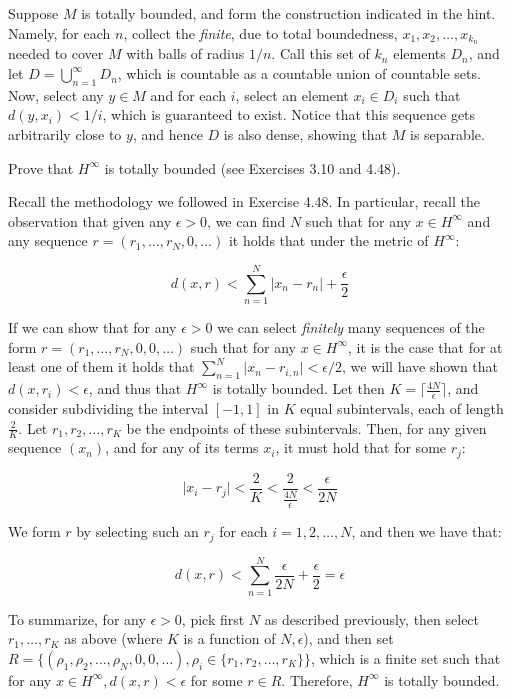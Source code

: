 \begin{solution}
    
    Suppose $M$ is totally bounded, and form the construction indicated in the hint.
    Namely, for each $n$, collect the \textit{finite}, due to total boundedness, $x_1, x_2, \ldots, x_{k_n}$ needed to cover $M$ with balls of radius $1/n$.
    Call this set of $k_n$ elements $D_n$, and let $D = \bigcup_{n=1}^{\infty} D_n$, which is countable as a countable union of countable sets.
    Now, select any $y \in M$ and for each $i$, select an element $x_i \in D_i$ such that $d(y, x_i) < 1/i$, which is guaranteed to exist.
    Notice that this sequence gets arbitrarily close to $y$, and hence $D$ is also dense, showing that $M$ is separable.
\end{solution}

\begin{exercise}{11}
    Prove that $H^{\infty}$ is totally bounded (see Exercises 3.10 and 4.48).
\end{exercise}

\begin{solution}
    
    Recall the methodology we followed in Exercise 4.48.
    In particular, recall the observation that given any $\epsilon > 0$, we can find $N$ such that for any $x \in H^{\infty}$ and any sequence $r = (r_1, \ldots, r_N, 0, \ldots)$ it holds that under the metric of $H^{\infty}$:

    \[d(x, r) < \sum_{n=1}^{N} \lvert x_n - r_n \rvert + \frac{\epsilon}{2}\]

    If we can show that for any $\epsilon > 0$ we can select \textit{finitely} many sequences of the form $r = (r_1, \ldots, r_N, 0, 0, \ldots)$ such that for any $x \in H^{\infty}$, it is the case that for at least one of them it holds that $\sum_{n=1}^{N} \lvert x_n - r_{i,n} \rvert < \epsilon/2$, we will have shown that $d(x, r_i) < \epsilon$, and thus that $H^{\infty}$ is totally bounded.
    Let then $K = \lceil \frac{4N}{\epsilon} \rceil$, and consider subdividing the interval $[-1, 1]$ in $K$ equal subintervals, each of length $\frac{2}{K}$.
    Let $r_1, r_2, \ldots, r_K$ be the endpoints of these subintervals.
    Then, for any given sequence $(x_n)$, and for any of its terms $x_i$, it must hold that for some $r_j$:

    \[\lvert x_i - r_j \rvert < \frac{2}{K} < \frac{2}{\frac{4N}{\epsilon}} < \frac{\epsilon}{2N}\]

    We form $r$ by selecting such an $r_j$ for each $i = 1, 2, \ldots, N$, and then we have that:

    \[d(x, r) < \sum_{n=1}^{N} \frac{\epsilon}{2N} + \frac{\epsilon}{2} = \epsilon\]

    To summarize, for any $\epsilon > 0$, pick first $N$ as described previously, then select $r_1, \ldots, r_K$ as above (where $K$ is a function of $N, \epsilon$), and then set $R = \{(\rho_1, \rho_2, \ldots, \rho_N, 0, 0, \ldots), \rho_i \in \{r_1, r_2, \ldots, r_K\}\}$, which is a finite set such that for any $x \in H^{\infty}, d(x, r) < \epsilon$ for some $r \in R$.
    Therefore, $H^{\infty}$ is totally bounded.
\end{solution}